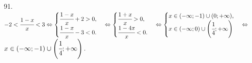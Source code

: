 91. $-2<\cfrac{1-x}{x}<3\Leftrightarrow \begin{cases} \cfrac{1-x}{x}+2>0,\\ \cfrac{1-x}{x}-3<0.\end{cases}\Leftrightarrow
\begin{cases} \cfrac{1+x}{x}>0,\\ \cfrac{1-4x}{x}<0.\end{cases}\Leftrightarrow \begin{cases} x\in(-\infty;-1)\cup(0;+\infty),\\ x\in (-\infty;0)\cup\left(\cfrac{1}{4};+\infty\right)\end{cases}\Leftrightarrow$\\$ x\in(-\infty;-1)\cup\left(\cfrac{1}{4};+\infty\right).$\\
